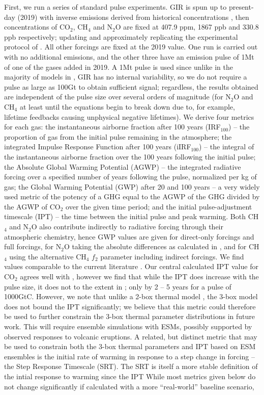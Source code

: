 \documentclass[gmd, manuscript]{copernicus}
\begin{document}
First, we run a series of standard pulse experiments. GIR is spun up to present-day (2019) with inverse emissions derived from historical concentrations \citep{Meinshausen2017}, then concentrations of CO$_2$, CH$_4$ and N$_2$O are fixed at 407.9 ppm, 1867 ppb and 330.8 ppb respectively; updating and approximately replicating the experimental protocol of \cite{Joos2013}. All other forcings are fixed at the 2019 value. One run is carried out with no additional emissions, and the other three have an emission pulse of 1Mt of one of the gases added in 2019. A 1Mt pulse is used since unlike in the majority of models in \cite{Joos2013}, GIR has no internal variability, so we do not require a pulse as large as 100Gt to obtain sufficient signal; regardless, the results obtained are independent of the pulse size over several orders of magnitude (for N$_2$O and CH$_4$ at least until the equations begin to break down due to, for example, lifetime feedbacks causing unphysical negative lifetimes). We derive four metrics for each gas: the instantaneous airborne fraction after 100 years (IRF$_{100}$) -- the proportion of gas from the initial pulse remaining in the atmosphere; the integrated Impulse Response Function after 100 years (iIRF$_{100}$) -- the integral of the instantaneous airborne fraction over the 100 years following the initial pulse; the Absolute Global Warming Potential (AGWP) -- the integrated radiative forcing over a specified number of years following the pulse, normalized per kg of gas; the Global Warming Potential (GWP) after 20 and 100 years -- a very widely used metric of the potency of a GHG equal to the AGWP of the GHG divided by the AGWP of CO$_2$ over the given time period; and the initial pulse-adjustment timescale (IPT) -- the time between the initial pulse and peak warming. Both CH$_4$ and N$_2$O also contribute indirectly to radiative forcing through their atmospheric chemistry, hence GWP values are given for direct-only forcings and full forcings, for N$_2$O taking the absolute differences as calculated in \cite{Myhre2013a}, and for CH$_4$ using the alternative CH$_4$ $f_2$ parameter including indirect forcings. We find values comparable to the current literature \citep{Joos2013,Ricke2014,Collins2019}. Our central calculated IPT value for CO$_2$ agrees well with \cite{Zickfeld2015,Ricke2014}, however we find that while the IPT does increase with the pulse size, it does not to the extent in \citeauthor{Zickfeld2015}; only by 2 -- 5 years for a pulse of 1000GtC. However, we note that unlike a 2-box thermal model \citep{Ricke2014}, the 3-box model does not bound the IPT significantly; we believe that this metric could therefore be used to further constrain the 3-box thermal parameter distributions in future work. This will require ensemble simulations with ESMs, possibly supported by observed responses to volcanic eruptions. A related, but distinct metric that may be used to constrain both the 3-box thermal parameters and IPT based on ESM ensembles is the initial rate of warming in response to a step change in forcing -- the Step Response Timescale (SRT). The SRT is itself a more stable definition of the intial response to warming since the IPT  While most metrics given below do not change significantly if calculated with a more ``real-world'' baseline scenario, 
\end{document}
